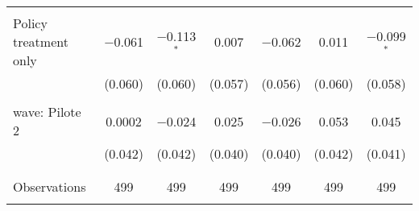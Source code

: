 \begin{tabular}{@{\extracolsep{5pt}}lcccccc}
  & & & & & & \\ 
 Policy treatment only & $-$0.061 & $-$0.113$^{*}$ & 0.007 & $-$0.062 & 0.011 & $-$0.099$^{*}$ \\ 
  & (0.060) & (0.060) & (0.057) & (0.056) & (0.060) & (0.058) \\ 
  & & & & & & \\ 
 wave: Pilote 2 & 0.0002 & $-$0.024 & 0.025 & $-$0.026 & 0.053 & 0.045 \\ 
  & (0.042) & (0.042) & (0.040) & (0.040) & (0.042) & (0.041) \\ 
  & & & & & & \\ 
\hline \\[-1.8ex] 

Observations & 499 & 499 & 499 & 499 & 499 & 499 \\ 
\hline 
\hline \\[-1.8ex] 
\end{tabular} 